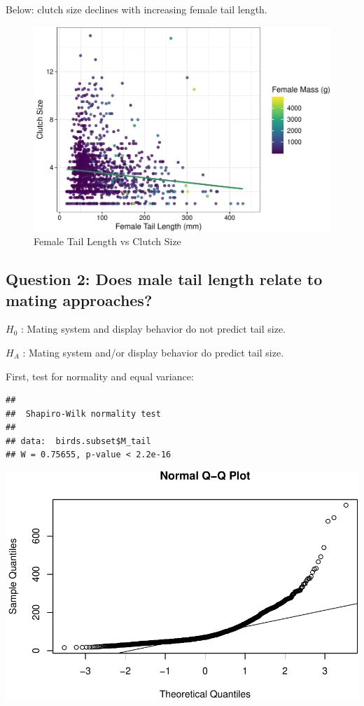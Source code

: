 \documentclass[
  12pt,
]{article}
\begin{document}
\newpage

Below: clutch size declines with increasing female tail length.

\begin{figure}
\centering
\includegraphics{Project_Code_files/figure-latex/q-1_plot_main-1.pdf}
\caption{Female Tail Length vs Clutch Size}
\end{figure}

\newpage

\hypertarget{question-2-does-male-tail-length-relate-to-mating-approaches}{%
\subsection{Question 2: Does male tail length relate to mating
approaches?}\label{question-2-does-male-tail-length-relate-to-mating-approaches}}

\(H_0\) : Mating system and display behavior do not predict tail size.

\(H_A\) : Mating system and/or display behavior do predict tail size.

First, test for normality and equal variance:

\begin{verbatim}
## 
##  Shapiro-Wilk normality test
## 
## data:  birds.subset$M_tail
## W = 0.75655, p-value < 2.2e-16
\end{verbatim}

\includegraphics{Project_Code_files/figure-latex/question_2_part_1-1.pdf}
\end{document}
